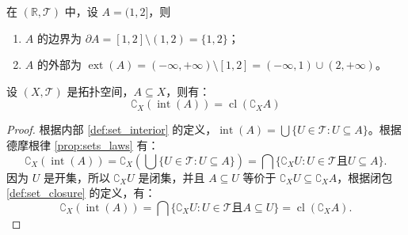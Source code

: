 \begin{example}
    在 $(\mathbb{R},\mathcal{T})$ 中，设 $A=(1,2]$，则
    \begin{enumerate}
        \item $A$ 的边界为 $\partial A= [1,2]\setminus (1,2) = \{1,2\}$；
        \item $A$ 的外部为 $\operatorname{ext}(A) = (-\infty,+\infty) \setminus [1,2] = (-\infty,1)\cup(2,+\infty)$。
    \end{enumerate}
\end{example}
\vspace{1em}

\begin{proposition}
    设 $(X,\mathcal{T})$ 是拓扑空间，$A\subseteq X$，则有：
    \[
        \complement_X(\operatorname{int}(A)) = \operatorname{cl}(\complement_X A)
    \]
    \label{prop:complement_interior_closure}
\end{proposition}

\begin{proof}
    根据内部 \ref{def:set_interior} 的定义，$\operatorname{int}(A) = \bigcup \{U \in \mathcal{T} : U \subseteq A\}$。根据德摩根律 \ref{prop:sets_laws} 有：
    \[
        \complement_X(\operatorname{int}(A)) = \complement_X\left(\bigcup \{U \in \mathcal{T} : U \subseteq A\}\right) = \bigcap \{\complement_X U : U \in \mathcal{T} \text{且} U \subseteq A\}.
    \]
    因为 $U$ 是开集，所以 $\complement_X U$ 是闭集，并且 $A\subseteq U$ 等价于 $\complement_X U \subseteq \complement_X A$，根据闭包 \ref{def:set_closure} 的定义，有：
    \[
        \complement_X(\operatorname{int}(A)) = \bigcap \{\complement_X U : U \in \mathcal{T} \text{且} A\subseteq U\}  = \operatorname{cl}(\complement_X A).
    \]
\end{proof}

